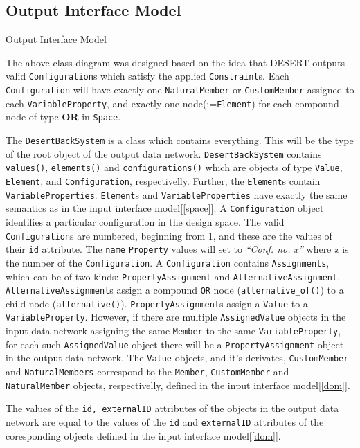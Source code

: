\documentclass{article}
\begin{document}
\subsection{Output Interface Model}
\label{do}
\vspace{1cm}
\begin{center}
{\par
 Output Interface Model}
\end{center}
\vspace{1cm}
{\par
The above class diagram was designed based on the idea that DESERT outputs valid {\tt Configuration}s which satisfy the applied {\tt Constraint}s. Each {\tt Configuration} will have exactly one  {\tt NaturalMember} or {\tt CustomMember} assigned to each {\tt VariableProperty}, and exactly one node(:={\tt Element}) for each compound node of type {\bf OR} in {\tt Space}.
}
{\par
The {\tt DesertBackSystem} is a class which contains everything. This will be the type of the root object of the output data network.  {\tt DesertBackSystem} contains {\tt values()}, {\tt elements()} and {\tt  configurations()} which are objects of type {\tt Value}, {\tt Element}, and {\tt Configuration}, respectivelly.  Further, the {\tt Element}s contain {\tt VariableProperties}. {\tt Element}s and {\tt VariableProperties} have exactly the same semantics as in the input interface model[\ref{space}]. 
A {\tt Configuration} object identifies a particular configuration in the design space. The valid {\tt Configuration}s are numbered, beginning from 1, and these are the values of their {\tt id} attribute. The {\tt name} {\tt Property} values will set to {\it ``Conf. no. x''} where {\it x} is the number of the {\tt Configuration}. A {\tt Configuration} contains {\tt Assignments}, which can be of two kinds: {\tt PropertyAssignment} and {\tt AlternativeAssignment}.  {\tt AlternativeAssignment}s assign a compound {\tt OR} node ({\tt alternative\_of()}) to a child node ({\tt alternative()}). {\tt PropertyAssignment}s assign a {\tt Value} to a {\tt VariableProperty}. However, if there are multiple {\tt AssignedValue}  objects in the input data network assigning the same {\tt Member} to the same {\tt VariableProperty}, for each such {\tt AssignedValue} object there will be a {\tt PropertyAssignment} object in the output data network. The {\tt Value} objects, and it's derivates, {\tt CustomMember} and {\tt NaturalMembers}  correspond to the {\tt Member}, {\tt CustomMember} and {\tt NaturalMember}  objects, respectivelly,  defined in the input interface model[\ref{dom}].
}
{\par The values of the {\tt id, externalID} attributes of the objects in the output data network are equal to the values of  the {\tt id} and {\tt externalID} attributes of the coresponding objects defined in the input interface model[\ref{dom}].
}
\end{document}
